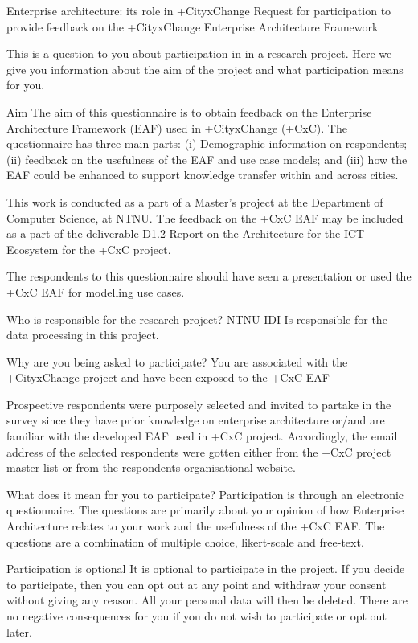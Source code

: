 
Enterprise architecture: its role in +CityxChange
Request for participation to provide feedback on the +CityxChange Enterprise Architecture Framework

This is a question to you about participation in in a research project. Here we give you information about the aim of the project and what participation means for you.

Aim
The aim of this questionnaire is to obtain feedback on the Enterprise Architecture Framework (EAF) used in +CityxChange (+CxC). The questionnaire has three main parts: (i) Demographic information on respondents; (ii) feedback on the usefulness of the EAF and use case models; and (iii) how the EAF could be enhanced to support knowledge transfer within and across cities.

This work is conducted as a part of a Master’s project at the Department of Computer Science, at NTNU. The feedback on the +CxC EAF may be included as a part of the deliverable D1.2 Report on the Architecture for the ICT Ecosystem for the +CxC project.

The respondents to this questionnaire should have seen a presentation or used the +CxC EAF for modelling use cases.

Who is responsible for the research project?
NTNU IDI Is responsible for the data processing in this project.

Why are you being asked to participate?
You are associated with the +CityxChange project and have been exposed to the +CxC EAF

Prospective respondents were purposely selected and invited to partake in the survey since they have prior knowledge on enterprise architecture or/and are familiar with the developed EAF used in +CxC project. Accordingly, the email address of the selected respondents were gotten either from the +CxC project master list or from the respondents organisational website.

What does it mean for you to participate?
Participation is through an electronic questionnaire. The questions are primarily about your opinion of how Enterprise Architecture relates to your work and the usefulness of the +CxC EAF. The questions are a combination of multiple choice, likert-scale and free-text.

Participation is optional
It is optional to participate in the project. If you decide to participate, then you can opt out at any point and withdraw your consent without giving any reason. All your personal data will then be deleted. There are no negative consequences for you if you do not wish to participate or opt out later.

